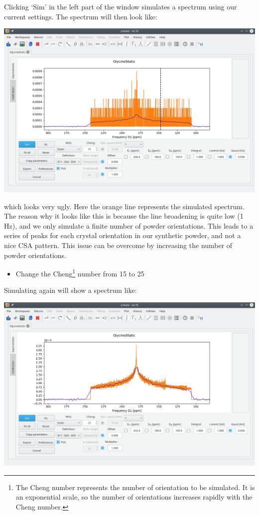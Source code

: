 \documentclass[11pt,a4paper]{article}
\begin{document}
Clicking `Sim' in the left part of the window simulates a spectrum using our current settings.
The spectrum will then look like:
\begin{center}
\includegraphics[width=0.8\linewidth]{Figs/Fig3.png}
\end{center}
which looks very ugly.
Here the orange line represents the simulated spectrum.
The reason why it looks like this is because the line broadening is quite low (1 Hz), and we only simulate a finite number of powder orientations.
This leads to a series of peaks for each crystal orientation in our synthetic powder, and not a nice CSA pattern.
This issue can be overcome by increasing the number of powder orientations.
\begin{itemize}
  \item Change the Cheng\footnote{The Cheng number represents the number of orientation to be
	 simulated. It is an exponential scale, so the number of orientations increases rapidly with the Cheng number.} number from 15 to 25
\end{itemize}
Simulating again will show a spectrum like:
\begin{center}
\includegraphics[width=0.8\linewidth]{Figs/Fig4.png}
\end{center}
\end{document}
